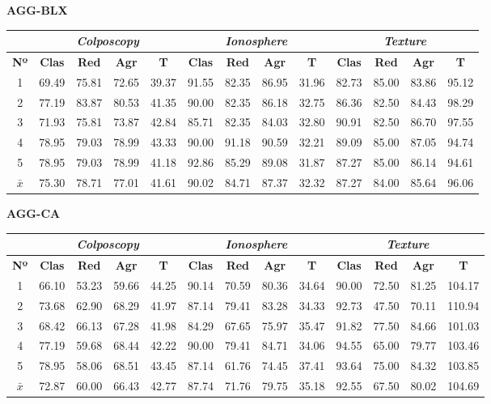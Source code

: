 \documentclass[12pt]{article}
\begin{document}
\textbf{AGG-BLX}

\begin{table}[h!]
\begin{tabular}{ccccc|cccc|cccc}
 & \multicolumn{4}{c}{\textit{Colposcopy}} & \multicolumn{4}{c}{\textit{Ionosphere}} & \multicolumn{4}{c}{\textit{Texture}} \\ \hline
\textbf{Nº} & \textbf{Clas} & \textbf{Red} & \textbf{Agr} & \textbf{T} & \textbf{Clas} & \textbf{Red} & \textbf{Agr} & \textbf{T} & \textbf{Clas} & \textbf{Red} & \textbf{Agr} & \textbf{T} \\ \hline
1 & 69.49 & 75.81 & 72.65 & 39.37  & 91.55 & 82.35 & 86.95 & 31.96  & 82.73 & 85.00 & 83.86 & 95.12 \\
2 & 77.19 & 83.87 & 80.53 & 41.35  & 90.00 & 82.35 & 86.18 & 32.75  & 86.36 & 82.50 & 84.43 & 98.29 \\
3 & 71.93 & 75.81 & 73.87 & 42.84  & 85.71 & 82.35 & 84.03 & 32.80  & 90.91 & 82.50 & 86.70 & 97.55 \\
4 & 78.95 & 79.03 & 78.99 & 43.33  & 90.00 & 91.18 & 90.59 & 32.21  & 89.09 & 85.00 & 87.05 & 94.74 \\
5 & 78.95 & 79.03 & 78.99 & 41.18  & 92.86 & 85.29 & 89.08 & 31.87  & 87.27 & 85.00 & 86.14 & 94.61 \\
\hline
$\bar{x}$  & 75.30 & 78.71 & 77.01 & 41.61 & 90.02 & 84.71 & 87.37 & 32.32  & 87.27 & 84.00 & 85.64 & 96.06
\end{tabular}
\end{table}

\textbf{AGG-CA}

\begin{table}[h!]
\begin{tabular}{ccccc|cccc|cccc}
 & \multicolumn{4}{c}{\textit{Colposcopy}} & \multicolumn{4}{c}{\textit{Ionosphere}} & \multicolumn{4}{c}{\textit{Texture}} \\ \hline
\textbf{Nº} & \textbf{Clas} & \textbf{Red} & \textbf{Agr} & \textbf{T} & \textbf{Clas} & \textbf{Red} & \textbf{Agr} & \textbf{T} & \textbf{Clas} & \textbf{Red} & \textbf{Agr} & \textbf{T} \\ \hline
1 & 66.10 & 53.23 & 59.66 & 44.25 & 90.14 & 70.59 & 80.36 & 34.64 & 90.00 & 72.50 & 81.25 & 104.17 \\
2 & 73.68 & 62.90 & 68.29 & 41.97 & 87.14 & 79.41 & 83.28 & 34.33 & 92.73 & 47.50 & 70.11 & 110.94 \\
3 & 68.42 & 66.13 & 67.28 & 41.98 & 84.29 & 67.65 & 75.97 & 35.47 & 91.82 & 77.50 & 84.66 & 101.03 \\
4 & 77.19 & 59.68 & 68.44 & 42.22 & 90.00 & 79.41 & 84.71 & 34.06 & 94.55 & 65.00 & 79.77 & 103.46 \\
5 & 78.95 & 58.06 & 68.51 & 43.45 & 87.14 & 61.76 & 74.45 & 37.41 & 93.64 & 75.00 & 84.32 & 103.85 \\
\hline
$\bar{x}$ & 72.87 & 60.00 & 66.43 & 42.77 & 87.74 & 71.76 & 79.75 & 35.18 & 92.55 & 67.50 & 80.02 & 104.69 \\
\end{tabular}
\end{table}
\end{document}
